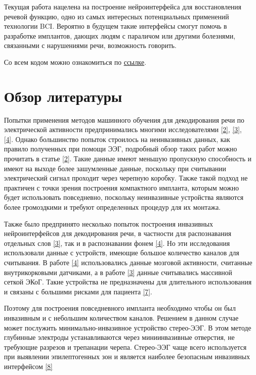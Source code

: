 \documentclass[a4paper,14pt]{extarticle}
\begin{document}
Текущая работа нацелена на построение нейроинтерфейса для восстановления речевой функцию, одно из самых интересных потенциальных применений технологии BCI. Вероятно в будущем такие интерфейсы смогут помочь в разработке имплантов, дающих людям с параличом или другими болезнями, связанными с нарушениями речи, возможность говорить.

Со всем кодом можно ознакомиться по \href{https://github.com/sizovk/speech_bci}{ссылке}.
\section{Обзор литературы}

Попытки применения методов машинного обучения для декодирования речи по электрической активности предпринимались многими исследователями \hyperlink{b_2}{[2]}, \hyperlink{b_3}{[3]}, \hyperlink{b_4}{[4]}. Однако большинство попыток строилось на неинвазивных данных, как правило полученных при помощи ЭЭГ, подробный обзор таких работ можно прочитать в статье \hyperlink{b_2}{[2]}. Такие данные имеют меньшую пропускную способность и имеют на выходе более зашумленные данные, поскольку при считывании электрический сигнал проходит через черепную коробку. Также такой подход не практичен с точки зрения построения компактного импланта, которым можно будет использовать повседневно, поскольку неинвазивные устройства являются более громоздкими и требуют определенных процедур для их монтажа.

Также было предпринято несколько попыток построения инвазивных нейроинтерфейсов для декодирования речи, в частности для распознавания отдельных слов \hyperlink{b_3}{[3]}, так и в распознавании фонем \hyperlink{b_4}{[4]}. Но эти исследования использовали данные с устройств, имеющие большое количество каналов для считывания. В работе \hyperlink{b_4}{[4]} использовались данные мозговой активности, считанные внутрикорковыми датчиками, а в работе \hyperlink{b_3}{[3]} данные считывались массивной сеткой ЭКоГ. Такие устройства не предназначены для длительного использования и связаны с большими рисками для пациента \hyperlink{b_7}{[7]}.

Поэтому для построения повседневного импланта необходимо чтобы он был инвазивным и с небольшим количеством каналов. Решением в данном случае может послужить минимально-инвазивное устройство стерео-ЭЭГ. В этом методе глубинные электроды устанавливаются через миниинвазивные отверстия, не требующие разрезов и трепанации черепа. Стерео-ЭЭГ чаще всего используется при выявлении эпилептогенных зон и является наиболее безопасным инвазивных интерфейсом \hyperlink{b_8}{[8]}
\end{document}

